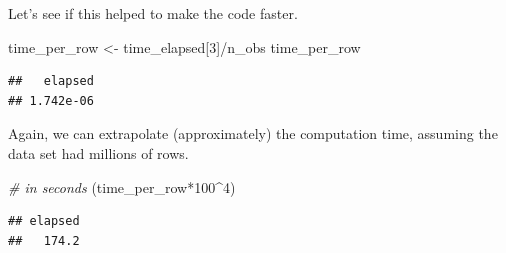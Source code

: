 \documentclass[
  12pt,
]{style/krantz}
\newenvironment{Shaded}{\begin{snugshade}}{\end{snugshade}}
\newcommand{\CommentTok}[1]{\textcolor[rgb]{0.56,0.35,0.01}{\textit{#1}}}
\newcommand{\ConstantTok}[1]{\textcolor[rgb]{0.00,0.00,0.00}{#1}}
\newcommand{\ControlFlowTok}[1]{\textcolor[rgb]{0.13,0.29,0.53}{\textbf{#1}}}
\newcommand{\DecValTok}[1]{\textcolor[rgb]{0.00,0.00,0.81}{#1}}
\newcommand{\FloatTok}[1]{\textcolor[rgb]{0.00,0.00,0.81}{#1}}
\newcommand{\FunctionTok}[1]{\textcolor[rgb]{0.00,0.00,0.00}{#1}}
\newcommand{\NormalTok}[1]{#1}
\newcommand{\OtherTok}[1]{\textcolor[rgb]{0.56,0.35,0.01}{#1}}
\newcommand{\SpecialCharTok}[1]{\textcolor[rgb]{0.00,0.00,0.00}{#1}}
\begin{document}
\begin{Shaded}
\end{Shaded}

Let's see if this helped to make the code faster.

\begin{Shaded}
\begin{Highlighting}[]
\NormalTok{time\_per\_row }\OtherTok{\textless{}{-}}\NormalTok{ time\_elapsed[}\DecValTok{3}\NormalTok{]}\SpecialCharTok{/}\NormalTok{n\_obs}
\NormalTok{time\_per\_row}
\end{Highlighting}
\end{Shaded}

\begin{verbatim}
##   elapsed 
## 1.742e-06
\end{verbatim}

Again, we can extrapolate (approximately) the computation time, assuming the data set had millions of rows.

\begin{Shaded}
\begin{Highlighting}[]
\CommentTok{\# in seconds}
\NormalTok{(time\_per\_row}\SpecialCharTok{*}\DecValTok{100}\SpecialCharTok{\^{}}\DecValTok{4}\NormalTok{) }
\end{Highlighting}
\end{Shaded}

\begin{verbatim}
## elapsed 
##   174.2
\end{verbatim}
\end{document}
